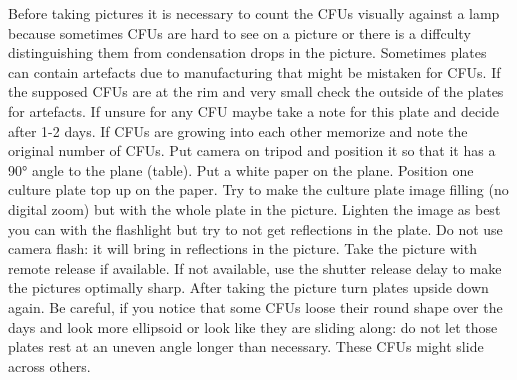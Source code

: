 \documentclass[hyperref]{labbook}
\begin{document}
Before taking pictures it is necessary to count the CFUs visually against a lamp because sometimes CFUs are hard to see on a picture or there is a diffculty distinguishing them from condensation drops in the picture. Sometimes plates can contain artefacts due to manufacturing that might be mistaken for CFUs. If the supposed CFUs are at the rim and very small check the outside of the plates for artefacts. If unsure for any CFU maybe take a note for this plate and decide after 1-2 days. If CFUs are growing into each other memorize and note the original number of CFUs. Put camera on tripod and position it so that it has a 90° angle to the plane (table). Put a white paper on the plane. Position one culture plate top up on the paper. Try to make the culture plate image filling (no digital zoom) but with the whole plate in the picture. Lighten the image as best you can with the flashlight but try to not get reflections in the plate. Do not use camera flash: it will bring in reflections in the picture. Take the picture with remote release if available. If not available, use the shutter release delay to make the pictures optimally sharp. After taking the picture turn plates upside down again. Be careful, if you notice that some CFUs loose their round shape over the days and look more ellipsoid or look like they are sliding along: do not let those plates rest at an uneven angle longer than necessary. These CFUs might slide across others.
\end{document}
